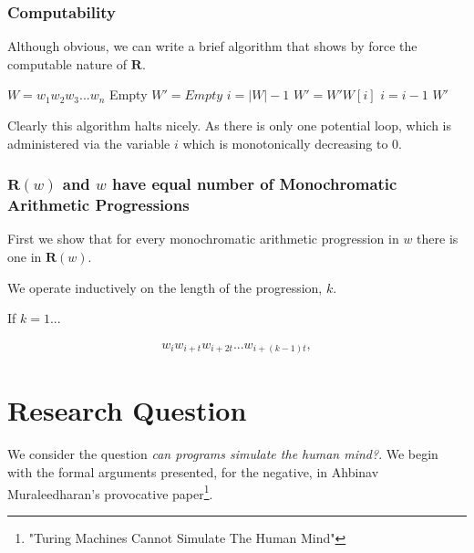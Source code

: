 \documentclass{article}
\begin{document}
\subsubsection*{Computability}
Although obvious, we can write a brief algorithm that shows by force the computable nature of $\bm{R}$.

\begin{algorithmic}[1]
	\REQUIRE $W = w_1w_2w_3...w_n$
			\RETURN Empty 
	\ENDIF
	\STATE $W' = Empty$
	\STATE $i = |W| - 1$
		\STATE $W' = W'W[i]$
		\STATE $i = i - 1$
	\ENDWHILE
	\RETURN $W'$ 
\end{algorithmic}

Clearly this algorithm halts nicely. As there is only one potential loop, which is administered via the variable $i$ which is monotonically decreasing to 0.

\subsubsection*{$\bm{R}(w)$ and $w$ have equal number of Monochromatic Arithmetic Progressions}
First we show that for every monochromatic arithmetic progression in $w$ there is one in $\bm{R}(w)$.

We operate inductively on the length of the progression, $k$.

If $k=1$...

\begin{align*}
	w_iw_{i+t}w_{i+2t}...w_{i+(k-1)t},
\end{align*}


\section*{Research Question}
We consider the question \emph{can programs simulate the human mind?}. We begin with the formal arguments presented, for the negative, in Ahbinav Muraleedharan's provocative paper\footnote{"Turing Machines Cannot Simulate The Human Mind"}.
\end{document}
